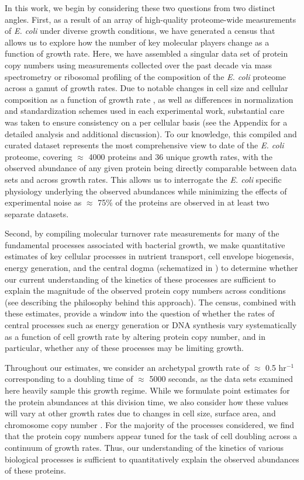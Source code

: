 In this work, we begin by considering these two questions from two distinct
angles. First, as a result of an array of high-quality proteome-wide
measurements of \textit{E. coli} under diverse growth conditions, we have
generated a census that allows us to explore how the number of key molecular
players change as a function of growth rate. Here, we have assembled a singular
data set of protein copy numbers using measurements collected over the past
decade via mass spectrometry \citep{schmidt2016, peebo2015, valgepea2013} or
ribosomal profiling \citep{li2014} of the composition of the \textit{E. coli}
proteome across a gamut of growth rates. Due to notable changes in cell size and
cellular composition as a function of growth rate \citep{bremer2008,
taheriaraghi2015}, as well as differences in normalization and standardization
schemes used in each experimental work, substantial care was taken to ensure
consistency on a per cellular basis (see the Appendix for a detailed analysis
and additional discussion). To our knowledge, this compiled and curated dataset
represents the most comprehensive view to date of the \textit{E. coli} proteome,
covering $\approx$ 4000 proteins and 36 unique growth rates, with the observed
abundance of any given protein being directly comparable between data sets and
across growth rates. This allows us to interrogate  the \textit{E. coli}
specific physiology underlying the observed abundances while  minimizing the
effects of experimental noise as  $\approx$ 75\% of the  proteins are observed
in at least two separate datasets.

Second, by compiling molecular turnover rate measurements for many of the
fundamental processes associated with bacterial growth, we make quantitative
estimates of key cellular processes in nutrient transport, cell envelope biogenesis, energy generation, and the central dogma (schematized in
) to determine whether our current understanding of the
kinetics of these processes are sufficient to explain the magnitude of the
observed protein copy numbers across conditions (see 
describing the philosophy behind this approach). The census, combined with
these estimates, provide a window into the question of whether the rates of
central processes such as energy generation or DNA synthesis vary
systematically as a function of cell growth rate by altering protein copy
number, and in particular, whether any of these processes may be limiting growth.

Throughout our estimates, we consider an archetypal growth rate of $\approx$
0.5 hr$^{-1}$ corresponding to a doubling time of $\approx$ 5000 seconds, as
the data sets examined here heavily sample this growth regime. While we
formulate point estimates for the protein abundances at this division time,
we also consider how these values will vary at other growth rates due to
changes in cell size, surface area, and chromosome copy number
\citep{taheriaraghi2015, harris2018}. For the majority of the processes
considered, we find that the protein copy numbers appear tuned for the task
of cell doubling across a continuum of growth rates. Thus, our understanding
of the kinetics of various biological processes is sufficient to
quantitatively explain the observed abundances of these proteins.

